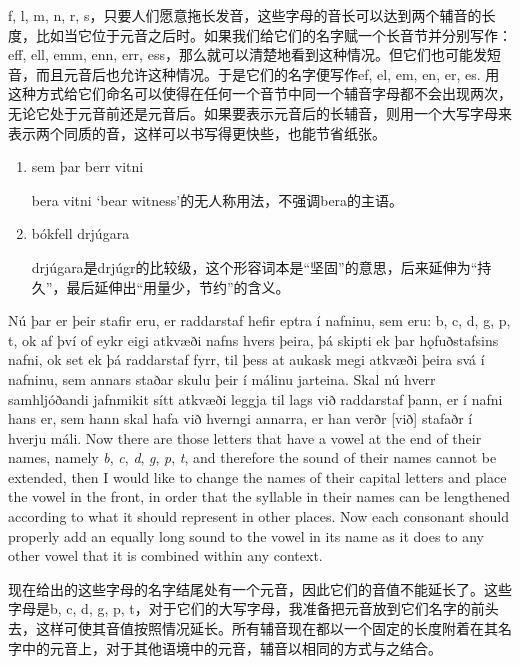 \begin{translation*}{}
  f, l, m, n, r, s，只要人们愿意拖长发音，这些字母的音长可以达到两个辅音的长度，比如当它位于元音之后时。如果我们给它们的名字赋一个长音节并分别写作：eff, ell, emm, enn, err, ess，那么就可以清楚地看到这种情况。但它们也可能发短音，而且元音后也允许这种情况。于是它们的名字便写作ef, el, em, en, er, es. 用这种方式给它们命名可以使得在任何一个音节中同一个辅音字母都不会出现两次，无论它处于元音前还是元音后。如果要表示元音后的长辅音，则用一个大写字母来表示两个同质的音，这样可以书写得更快些，也能节省纸张。
\end{translation*}
\begin{grammar*}{}
  \begin{enumerate}[leftmargin=*]
    \item sem þar berr vitni

          bera vitni `bear witness'的无人称用法，不强调bera的主语。

    \item bókfell drjúgara

          drjúgara是drjúgr的比较级，这个形容词本是“坚固”的意思，后来延伸为“持久”，最后延伸出“用量少，节约”的含义。
  \end{enumerate}
\end{grammar*}
\begin{paracol}{2}
  Nú þar er þeir stafir eru, er raddarstaf hefir eptra í nafninu, sem eru: b, c, d, g, p, t, ok af því of eykr eigi atkvæði nafns hvers þeira, þá skipti ek þar hǫfuðstafsins nafni, ok set ek þá raddarstaf fyrr, til þess at aukask megi atkvæði þeira svá í nafninu, sem annars staðar skulu þeir í málinu jarteina. Skal nú hverr samhljóðandi jafnmikit sítt atkvæði leggja til lags við raddarstaf þann, er í nafni hans er, sem hann skal hafa við hverngi annarra, er han verðr [við] stafaðr í hverju máli.
  \switchcolumn
  Now there are those letters that have a vowel at the end of their names, namely \textit{b}, \textit{c}, \textit{d}, \textit{g}, \textit{p}, \textit{t}, and therefore the sound of their names cannot be extended, then I would like to change the names of their capital letters and place the vowel in the front, in order that the syllable in their names can be lengthened according to what it should represent in other places. Now each consonant should properly add an equally long sound to the vowel in its name as it does to any other vowel that it is combined within any context.
\end{paracol}
\begin{translation*}{}
  现在给出的这些字母的名字结尾处有一个元音，因此它们的音值不能延长了。这些字母是b, c, d, g, p, t，对于它们的大写字母，我准备把元音放到它们名字的前头去，这样可使其音值按照情况延长。所有辅音现在都以一个固定的长度附着在其名字中的元音上，对于其他语境中的元音，辅音以相同的方式与之结合。
\end{translation*}
